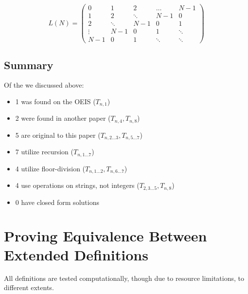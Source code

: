 \documentclass[conference]{IEEEtran}
\begin{document}
\begin{equation}
L(N) = \begin{pmatrix}
0 & 1 & 2 & \dots & N\!\!-\!\!1 \\
1 & 2 & \ddots & N\!\!-\!\!1 & 0 \\
2 & \ddots & N\!\!-\!\!1 & 0 & 1 \\
\vdots & N\!\!-\!\!1 & 0 & 1 & \ddots \\
N\!\!-\!\!1& 0 & 1 & \ddots & \ddots
\end{pmatrix}
\end{equation}

\subsection{Summary}

Of the \TotalExtensions we discussed above:
\begin{itemize}
    \item 1 was found on the OEIS ($T_{n,1}$)
    \item 2 were found in another paper ($T_{n,4}, T_{n,8}$)
    \item 5 are original to this paper ($T_{n,2\dots3}, T_{n,5\dots7}$)
    \\%
    \item 7 utilize recursion ($T_{n,1\dots7}$)
    \item 4 utilize floor-division ($T_{n,1\dots2}, T_{n,6\dots7}$)
    \item 4 use operations on strings, not integers ($T_{2,3\dots5}, T_{n,8}$)
    \item 0 have closed form solutions
\end{itemize}

\section{Proving Equivalence Between Extended Definitions}

All definitions are tested computationally, though due to resource limitations, to different extents.
\end{document}
